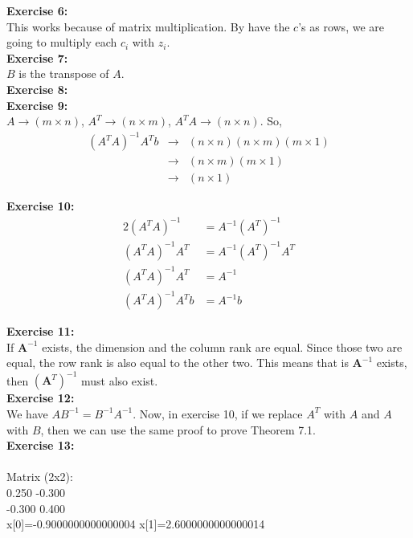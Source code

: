 \documentclass[10pt]{article}
\begin{document}
	\textbf{\large Exercise 6:}\\
	This works because of matrix multiplication. By have the $c$'s as rows, we are going to multiply each $c_i$ with $z_i$. 
	\\
	
	\textbf{\large Exercise 7:}\\
	$B$ is the transpose of $A$. 
	\\
	
	\textbf{\large Exercise 8:}\\
	
	\textbf{\large Exercise 9:}\\
	$A \rightarrow (m \times n)$, $A^T \rightarrow (n \times m)$, $A^TA \rightarrow (n \times n)$. So, \\
	$$\begin{array}{lllllll}
		(A^TA)^{-1}A^Tb &\rightarrow& (n \times n)(n \times m)(m \times 1)\\
		&\rightarrow& (n \times m)(m \times 1)\\
		&\rightarrow& (n \times 1)
	\end{array}$$
	
	\textbf{\large Exercise 10:}\\
	\begin{alignat*}{2}
		(A^TA)^{-1} &= A^{-1}(A^T)^{-1}\\
		(A^TA)^{-1}A^T &= A^{-1}(A^T)^{-1}A^T\\
		(A^TA)^{-1}A^T &= A^{-1}\\
		(A^TA)^{-1}A^Tb &= A^{-1}b
	\end{alignat*}
	
	\textbf{\large Exercise 11:}\\
	If $\textbf{A}^{-1}$ exists, the dimension and the column rank are equal. Since those two are equal, the row rank is also equal to the other two. This means that is $\textbf{A}^{-1}$ exists, then $\left(\textbf{A}^{T}\right)^{-1}$ must also exist.
	\\
	
	\textbf{\large Exercise 12:}\\
	We have $AB^{-1} = B^{-1}A^{-1}$. Now, in exercise 10, if we replace $A^T$ with $A$ and $A$ with $B$, then we can use the same proof to prove Theorem 7.1. 
	\\
	
	\textbf{\large Exercise 13:}\\\\
	Matrix (2x2):\\
	0.250 -0.300\\
	-0.300  0.400\\
	x[0]=-0.9000000000000004 x[1]=2.6000000000000014\\
	
\end{document}
